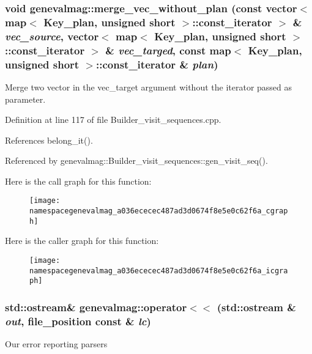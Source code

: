 \hypertarget{namespacegenevalmag_a036ececec487ad3d0674f8e5e0c62f6a}{
\subsubsection[{merge\_\-vec\_\-without\_\-plan}]{\setlength{\rightskip}{0pt plus 5cm}void genevalmag::merge\_\-vec\_\-without\_\-plan (const vector$<$ map$<$ Key\_\-plan, unsigned short $>$::const\_\-iterator $>$ \& {\em vec\_\-source}, \/  vector$<$ map$<$ Key\_\-plan, unsigned short $>$::const\_\-iterator $>$ \& {\em vec\_\-targed}, \/  const map$<$ Key\_\-plan, unsigned short $>$::const\_\-iterator \& {\em plan})}}
\label{namespacegenevalmag_a036ececec487ad3d0674f8e5e0c62f6a}
Merge two vector in the vec\_\-target argument without the iterator passed as parameter. 

Definition at line 117 of file Builder\_\-visit\_\-sequences.cpp.



References belong\_\-it().



Referenced by genevalmag::Builder\_\-visit\_\-sequences::gen\_\-visit\_\-seq().



Here is the call graph for this function:\nopagebreak
\begin{figure}[H]
\begin{center}
\leavevmode
\texttt{[image: namespacegenevalmag\_a036ececec487ad3d0674f8e5e0c62f6a\_cgraph]}
\end{center}
\end{figure}




Here is the caller graph for this function:\nopagebreak
\begin{figure}[H]
\begin{center}
\leavevmode
\texttt{[image: namespacegenevalmag\_a036ececec487ad3d0674f8e5e0c62f6a\_icgraph]}
\end{center}
\end{figure}


\hypertarget{namespacegenevalmag_a4093becff20c4564db790c08c1189aaf}{
\subsubsection[{operator$<$$<$}]{\setlength{\rightskip}{0pt plus 5cm}std::ostream\& genevalmag::operator$<$$<$ (std::ostream \& {\em out}, \/  file\_\-position const \& {\em lc})}}
\label{namespacegenevalmag_a4093becff20c4564db790c08c1189aaf}
Our error reporting parsers 

